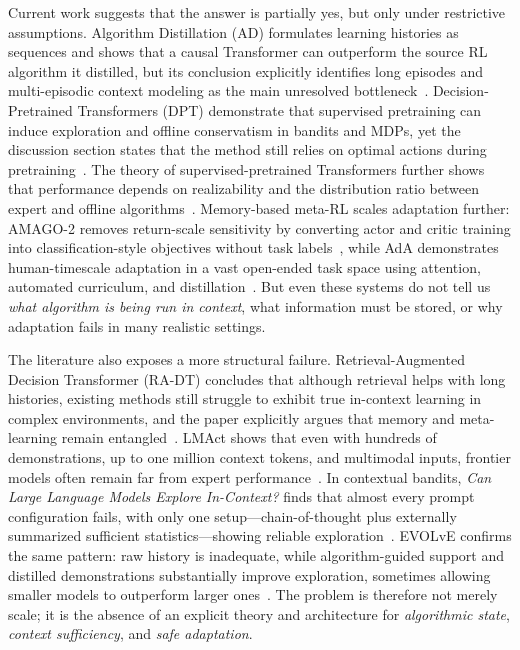 \documentclass[10pt,twocolumn,letterpaper]{article}
\begin{document}
Current work suggests that the answer is partially yes, but only under restrictive assumptions. Algorithm Distillation (AD) formulates learning histories as sequences and shows that a causal Transformer can outperform the source RL algorithm it distilled, but its conclusion explicitly identifies long episodes and multi-episodic context modeling as the main unresolved bottleneck~\cite{laskin2022ad}. Decision-Pretrained Transformers (DPT) demonstrate that supervised pretraining can induce exploration and offline conservatism in bandits and MDPs, yet the discussion section states that the method still relies on optimal actions during pretraining~\cite{lee2024dpt}. The theory of supervised-pretrained Transformers further shows that performance depends on realizability and the distribution ratio between expert and offline algorithms~\cite{lin2023provableicrl}. Memory-based meta-RL scales adaptation further: AMAGO-2 removes return-scale sensitivity by converting actor and critic training into classification-style objectives without task labels~\cite{grigsby2024amago2}, while AdA demonstrates human-timescale adaptation in a vast open-ended task space using attention, automated curriculum, and distillation~\cite{adaptive2023ada}. But even these systems do not tell us \emph{what algorithm is being run in context}, what information must be stored, or why adaptation fails in many realistic settings.

The literature also exposes a more structural failure. Retrieval-Augmented Decision Transformer (RA-DT) concludes that although retrieval helps with long histories, existing methods still struggle to exhibit true in-context learning in complex environments, and the paper explicitly argues that memory and meta-learning remain entangled~\cite{schmied2024radt}. LMAct shows that even with hundreds of demonstrations, up to one million context tokens, and multimodal inputs, frontier models often remain far from expert performance~\cite{ruoss2024lmact}. In contextual bandits, \emph{Can Large Language Models Explore In-Context?} finds that almost every prompt configuration fails, with only one setup---chain-of-thought plus externally summarized sufficient statistics---showing reliable exploration~\cite{krishnamurthy2024explore}. EVOLvE confirms the same pattern: raw history is inadequate, while algorithm-guided support and distilled demonstrations substantially improve exploration, sometimes allowing smaller models to outperform larger ones~\cite{nie2024evolve}. The problem is therefore not merely scale; it is the absence of an explicit theory and architecture for \emph{algorithmic state}, \emph{context sufficiency}, and \emph{safe adaptation}.
\end{document}
